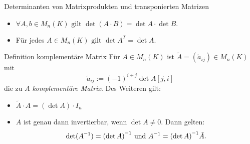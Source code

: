 \documentclass[main.tex]{subfiles}
\begin{document}
\begin{karte}{Determinanten von Matrixprodukten und transponierten Matrizen}
    \begin{itemize}
        \item \(\forall A,b \in M_n(K) \text{ gilt } 
        \det(A \cdot B) = \det A \cdot \det B.\)
        \item Für jedes \(A \in M_n(K) \text{ gilt } 
        \det A^T = \det A.\)
    \end{itemize}
\end{karte}
\begin{karte}{Definition komplementäre Matrix}
    Für \(A \in M_n(K)\) ist \(\tilde{A} = (\tilde{a}_{ij}) \in M_n(K)\) mit
    \[\tilde{a}_{ij} := (-1)^{i+j} \det A[j,i]\]
    die zu \(A\) \textit{komplementäre Matrix}.
    Des Weiteren gilt:
    \begin{itemize}
        \item \(\tilde{A} \cdot A = (\det A) \cdot I_n\)
        \item \(A\) ist genau dann invertierbar, wenn \(\det A \neq 0\). Dann gelten: 
        \[\det(\inverse A) = \inverse{(\det A)} \text{ und }
         \inverse A = \inverse{(\det A)} \tilde{A}.\]
    \end{itemize}
\end{karte}
\end{document}
